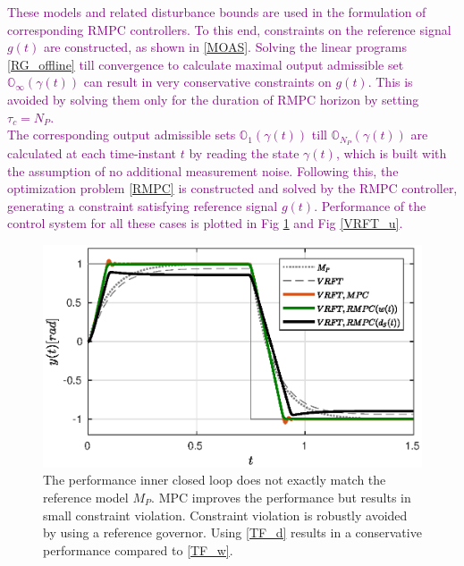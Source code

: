 \documentclass[letterpaper, 10 pt, conference]{ieeeconf}  %
\begin{document}
	\textcolor{purple}{These models and related disturbance bounds are used in the formulation of corresponding RMPC controllers. To this end, constraints on the reference signal $g(t)$ are constructed, as shown in \eqref{MOAS}. Solving the linear programs \eqref{RG_offline} till convergence to calculate maximal output admissible set $\mathbb{O}_{\infty}(\gamma(t))$ can result in very conservative constraints on $g(t)$. This is avoided by solving them only for the duration of RMPC horizon by setting $\tau_c = N_P$.  \\
	The corresponding output admissible sets $\mathbb{O}_{1}(\gamma(t))$ till $\mathbb{O}_{N_P}(\gamma(t))$ are calculated at each time-instant $t$ by reading the state $\gamma(t)$, which is built with the assumption of no additional measurement noise.
	Following this,
	the optimization problem \eqref{RMPC} is constructed and solved by the RMPC controller, generating a constraint satisfying reference signal $g(t)$.
	Performance of the control system for all these cases is plotted in Fig \ref{VRFT_y} and Fig \ref{VRFT_u}.}
	\begin{figure}[t]
		\hspace{-5pt}
		\includegraphics[scale = 0.60]{VRFT_vs_MPC.eps}
		\caption{The performance inner closed loop does not exactly match the reference model $M_P$. MPC improves the performance but results in small constraint violation. Constraint violation is robustly avoided by using a reference governor. Using \eqref{TF_d} results in a conservative performance compared to \eqref{TF_w}.  }
		\label{VRFT_y}
	\end{figure} 
	
\end{document}
